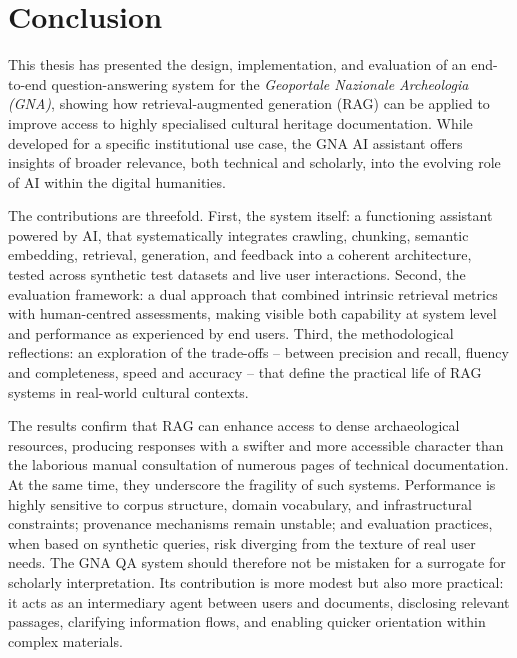 \chapter{Conclusion}
\label{chap:conclusion}
\begin{spacing}{1.5}
This thesis has presented the design, implementation, and evaluation of an end-to-end question-answering system for the \textit{Geoportale Nazionale Archeologia (GNA)}, showing how retrieval-augmented generation (RAG) can be applied to improve access to highly specialised cultural heritage documentation. While developed for a specific institutional use case, the GNA AI assistant offers insights of broader relevance, both technical and scholarly, into the evolving role of AI within the digital humanities.

The contributions are threefold. First, the system itself: a functioning assistant powered by AI, that systematically integrates crawling, chunking, semantic embedding, retrieval, generation, and feedback into a coherent architecture, tested across synthetic test datasets and live user interactions. Second, the evaluation framework: a dual approach that combined intrinsic retrieval metrics with human-centred assessments, making visible both capability at system level and performance as experienced by end users. Third, the methodological reflections: an exploration of the trade-offs -- between precision and recall, fluency and completeness, speed and accuracy -- that define the practical life of RAG systems in real-world cultural contexts.

The results confirm that RAG can enhance access to dense archaeological resources, producing responses with a swifter and more accessible character than the laborious manual consultation of numerous pages of technical documentation. At the same time, they underscore the fragility of such systems. Performance is highly sensitive to corpus structure, domain vocabulary, and infrastructural constraints; provenance mechanisms remain unstable; and evaluation practices, when based on synthetic queries, risk diverging from the texture of real user needs. The GNA QA system should therefore not be mistaken for a surrogate for scholarly interpretation. Its contribution is more modest but also more practical: it acts as an intermediary agent between users and documents, disclosing relevant passages, clarifying information flows, and enabling quicker orientation within complex materials.


\end{spacing}

